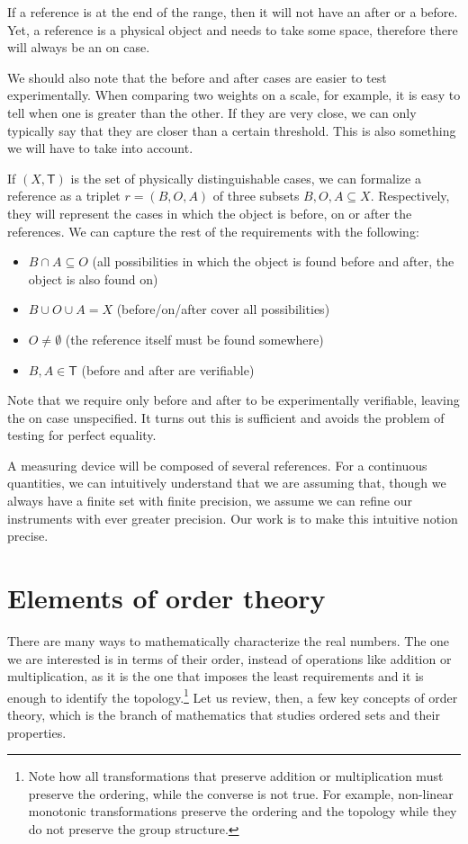 \documentclass[12pt]{iopart}
\begin{document}
If a reference is at the end of the range, then it will not have an after or a before. Yet, a reference is a physical object and needs to take some space, therefore there will always be an on case.

We should also note that the before and after cases are easier to test experimentally. When comparing two weights on a scale, for example, it is easy to tell when one is greater than the other. If they are very close, we can only typically say that they are closer than a certain threshold. This is also something we will have to take into account.

If $(X, \mathsf{T})$ is the set of physically distinguishable cases, we can formalize a reference as a triplet $r = (B, O, A)$ of three subsets $B, O, A \subseteq X$. Respectively, they will represent the cases in which the object is before, on or after the references. We can capture the rest of the requirements with the following:
\begin{itemize}
	\item $B \cap A \subseteq O$ (all possibilities in which the object is found before and after, the object is also found on)
	\item $B \cup O \cup A = X$ (before/on/after cover all possibilities)
	\item $O \neq \emptyset$ (the reference itself must be found somewhere)
	\item $B, A \in \mathsf{T}$ (before and after are verifiable)
\end{itemize}
Note that we require only before and after to be experimentally verifiable, leaving the on case unspecified. It turns out this is sufficient and avoids the problem of testing for perfect equality.

A measuring device will be composed of several references. For a continuous quantities, we can intuitively understand that we are assuming that, though we always have a finite set with finite precision, we assume we can refine our instruments with ever greater precision. Our work is to make this intuitive notion precise.

\section{Elements of order theory}

There are many ways to mathematically characterize the real numbers. The one we are interested is in terms of their order, instead of operations like addition or multiplication, as it is the one that imposes the least requirements and it is enough to identify the topology.\footnote{Note how all transformations that preserve addition or multiplication must preserve the ordering, while the converse is not true. For example, non-linear monotonic transformations preserve the ordering and the topology while they do not preserve the group structure.} Let us review, then, a few key concepts of order theory, which is the branch of mathematics that studies ordered sets and their properties.
\end{document}

